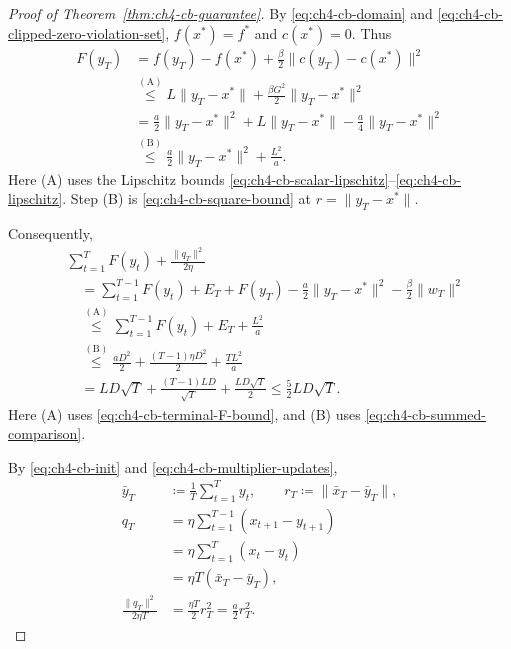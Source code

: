 \begin{proof}[Proof of Theorem~\ref{thm:ch4-cb-guarantee}]
By \eqref{eq:ch4-cb-domain} and \eqref{eq:ch4-cb-clipped-zero-violation-set},
$f(x^*)=f^*$ and $c(x^*)=0$. Thus
\begin{equation}\label{eq:ch4-cb-terminal-F-bound}
\begin{aligned}
F(y_T)
&=f(y_T)-f(x^*)+\frac\beta2\|c(y_T)-c(x^*)\|^2\\
&\overset{\mathrm{(A)}}{\le}
L\|y_T-x^*\|+\frac{\beta G^2}{2}\|y_T-x^*\|^2\\
&=\frac a2\|y_T-x^*\|^2
+L\|y_T-x^*\|-\frac a4\|y_T-x^*\|^2\\
&\overset{\mathrm{(B)}}{\le}\frac a2\|y_T-x^*\|^2+\frac{L^2}{a}.
\end{aligned}
\end{equation}
\nopagebreak[3]
Here (A) uses the Lipschitz bounds
\eqref{eq:ch4-cb-scalar-lipschitz}--\eqref{eq:ch4-cb-lipschitz}.
Step (B) is \eqref{eq:ch4-cb-square-bound} at $r=\|y_T-x^*\|$.

Consequently,
\begin{equation}\label{eq:ch4-cb-full-sum}
\begin{aligned}
&\sum_{t=1}^T F(y_t)+\frac{\|q_T\|^2}{2\eta}\\
&\quad=\sum_{t=1}^{T-1}F(y_t)+E_T
+F(y_T)-\frac a2\|y_T-x^*\|^2-\frac\beta2\|w_T\|^2\\
&\quad\overset{\mathrm{(A)}}{\le}
\sum_{t=1}^{T-1}F(y_t)+E_T+\frac{L^2}{a}\\
&\quad\overset{\mathrm{(B)}}{\le}
\frac{aD^2}{2}+\frac{(T-1)\eta D^2}{2}+\frac{TL^2}{a}\\
&\quad=LD\sqrt T+\frac{(T-1)LD}{\sqrt T}+\frac{LD\sqrt T}{2}
\le\frac52LD\sqrt T.
\end{aligned}
\end{equation}
\nopagebreak[3]
Here (A) uses \eqref{eq:ch4-cb-terminal-F-bound}, and (B) uses
\eqref{eq:ch4-cb-summed-comparison}.

By \eqref{eq:ch4-cb-init} and \eqref{eq:ch4-cb-multiplier-updates},
\begin{equation}\label{eq:ch4-cb-average-identity}
\begin{aligned}
\bar y_T&\coloneqq\frac1T\sum_{t=1}^T y_t,\qquad
r_T\coloneqq\|\bar x_T-\bar y_T\|,\\
q_T&=\eta\sum_{t=1}^{T-1}(x_{t+1}-y_{t+1})\\
&=\eta\sum_{t=1}^T(x_t-y_t)\\
&=\eta T(\bar x_T-\bar y_T),\\
\frac{\|q_T\|^2}{2\eta T}&=\frac{\eta T}{2}r_T^2=\frac a2r_T^2.
\end{aligned}
\end{equation}


\end{proof}
